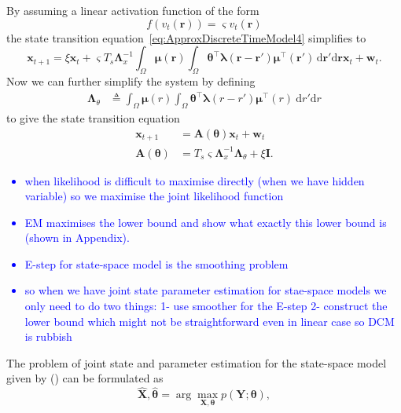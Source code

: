 \documentclass[11pt,draftcls,onecolumn,peerreview]{IEEEtran}
\newcommand{\parham}[1]{\textcolor{blue}{#1}}
\begin{document}
By assuming a linear activation function of the form
\begin{equation}
	f(v_t(\mathbf{r})) = \varsigma v_t(\mathbf{r})
\end{equation}
the state transition equation~\eqref{eq:ApproxDiscreteTimeModel4} simplifies to
\begin{equation}\label{eq:ApproxDiscreteTimeModel_Linear}
	\mathbf{x}_{t+1} = 
	\xi \mathbf{x}_t + 
	\varsigma T_s \mathbf{\Lambda}_{x}^{-1} \int_{\Omega}\boldsymbol\mu\left(\mathbf{r}\right)\int_\Omega { 
	    \boldsymbol\theta^\top\boldsymbol\lambda\left(\mathbf{r}-\mathbf{r}'\right)
	    \boldsymbol\mu^\top\left(\mathbf{r}'\right) 
	\, \mathrm{d}\mathbf{r}'\mathrm{d}\mathbf{r}} \mathbf{x}_t
	+ \mathbf{w}_t.
\end{equation}
Now we can further simplify the system by defining
\begin{align}
	\label{eq:Lambdatheta}
	 \mathbf{\Lambda}_{\theta} &\triangleq \int_{\Omega}\boldsymbol\mu\left(r\right) \int_\Omega { 
		   \boldsymbol\theta^\top\boldsymbol\lambda\left(r-r'\right)
		    \boldsymbol\mu^\top\left(r\right)\ \mathrm{d}r'\mathrm{d}r}
\end{align}
to give the state transition equation
\begin{align}\label{eq:StateEquation}
 \mathbf x_{t+1} &=\mathbf A(\boldsymbol \theta) \mathbf x_t+ \mathbf w_t\\
\label{eq:A_theta}
 \mathbf A(\boldsymbol \theta) &= T_s\varsigma\mathbf{\Lambda}_{x}^{-1}\mathbf{\Lambda}_{\theta}+\xi\mathbf I.
\end{align} 
\parham{
 \begin{itemize}
	\item when likelihood is difficult to maximise directly (when we have hidden variable) so we maximise the joint likelihood function 
	\item EM maximises the lower bound and show what exactly this lower bound is (shown in Appendix).
	\item E-step for state-space model is the smoothing problem
	\item so when we have joint state parameter estimation for stae-space models  we only need to do two things: 1- use smoother for the E-step 2- construct the lower bound which might not be straightforward even in linear case so DCM is rubbish
\end{itemize}}
The problem of joint state and parameter estimation for the state-space model given by () can be formulated as 
\begin{equation}
	{\hat{\mathbf X},\hat{\boldsymbol\theta}}=\arg\max_{\mathbf X,\boldsymbol\theta}p(\mathbf Y;\boldsymbol\theta),
 \end{equation}  
\end{document}
